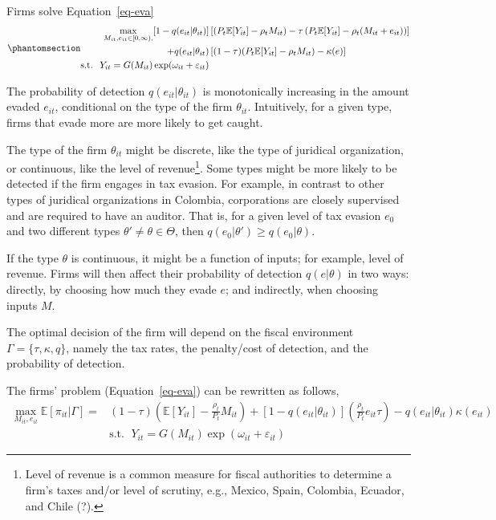 \documentclass[
  12pt]{article}
\begin{document}
Firms solve Equation~\ref{eq-eva}
\begin{equation}\phantomsection\label{eq-eva}{
\begin{aligned}
  \max_{M_{it}, e_{it}\in [0,\infty), } [1-q(e_{it}|\theta_{it})]&\left[(P_t\mathbb{E}[Y_{it}]-\rho_{t} M_{it})-\tau\left(P_t\mathbb{E}[Y_{it}]-\rho_{t} (M_{it}+e_{it})\right)\right]\\
  +q(e_{it}|\theta_{it})&\left[(1-\tau)(P_t\mathbb{E}[Y_{it}]-\rho_{t} M_{it})-\kappa(e)\right] \\
  \text{s.t. }\; Y_{it}=G(M_{it})\exp(\omega_{it}+\varepsilon_{it})
\end{aligned}
}\end{equation}

The probability of detection \(q(e_{it}|\theta_{it})\) is monotonically
increasing in the amount evaded \(e_{it}\), conditional on the type of
the firm \(\theta_{it}\). Intuitively, for a given type, firms that
evade more are more likely to get caught.

The type of the firm \(\theta_{it}\) might be discrete, like the type of
juridical organization, or continuous, like the level of
revenue\footnote{Level of revenue is a common measure for fiscal
  authorities to determine a firm's taxes and/or level of scrutiny,
  e.g., Mexico, Spain, Colombia, Ecuador, and Chile (?).}. Some types
might be more likely to be detected if the firm engages in tax evasion.
For example, in contrast to other types of juridical organizations in
Colombia, corporations are closely supervised and are required to have
an auditor. That is, for a given level of tax evasion \(e_0\) and two
different types \(\theta' \not= \theta \in \mathbfcal{\Theta}\), then
\(q(e_0|\theta')\ge q(e_0|\theta)\).

If the type \(\theta\) is continuous, it might be a function of inputs;
for example, level of revenue. Firms will then affect their probability
of detection \(q(e|\theta)\) in two ways: directly, by choosing how much
they evade \(e\); and indirectly, when choosing inputs \(M\).

The optimal decision of the firm will depend on the fiscal environment
\(\Gamma=\{\tau, \kappa, q \}\), namely the tax rates, the penalty/cost
of detection, and the probability of detection.

The firms' problem (Equation~\ref{eq-eva}) can be rewritten as follows,
\[
\begin{aligned}
  \max_{M_{it},e_{it}} \mathbb{E}[\pi_{it}|\Gamma] = &(1-\tau)\left(\mathbb{E}[Y_{it}]-\frac{\rho_{t}}{P_t} M_{it}\right)+[1-q(e_{it}|\theta_{it})]\left(\frac{\rho_{t}}{P_t}e_{it}\tau\right)
  -q(e_{it}|\theta_{it})\kappa(e_{it}) \\
  &\text{s.t. }\; Y_{it}=G(M_{it})\exp(\omega_{it}+\varepsilon_{it})
\end{aligned}
\]
\end{document}
